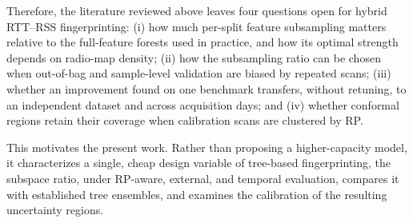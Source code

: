 Therefore, the literature reviewed above leaves four questions open for hybrid RTT--RSS fingerprinting: (i) how much per-split feature subsampling matters relative to the full-feature forests used in practice, and how its optimal strength depends on radio-map density; (ii) how the subsampling ratio can be chosen when out-of-bag and sample-level validation are biased by repeated scans; (iii) whether an improvement found on one benchmark transfers, without retuning, to an independent dataset and across acquisition days; and (iv) whether conformal regions retain their coverage when calibration scans are clustered by RP.

This motivates the present work. Rather than proposing a higher-capacity model, it characterizes a single, cheap design variable of tree-based fingerprinting, the subspace ratio, under RP-aware, external, and temporal evaluation, compares it with established tree ensembles, and examines the calibration of the resulting uncertainty regions.
